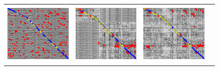 \documentclass[letterpaper, 10 pt, conference]{ieeeconf}  %
\begin{document}
\newcommand{\imgH}{3cm}
\newcommand{\imgW}{4cm}
\begin{figure}[!h]
 \begin{tabular*}{\textwidth}[t]{cccc}
  \includegraphics[width=\imgW,height=\imgH]{campus-io-without-bad-101} &
  \includegraphics[width=\imgW,height=\imgH]{campus-io-with-bad-71} &
  \includegraphics[width=\imgW,height=\imgH]{campus-io-without-good-105} &

\end{tabular*}
\end{figure}
\end{document}
